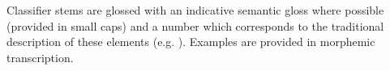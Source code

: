 \documentclass[output=paper,colorlinks,citecolor=brown]{langscibook}
\begin{document}
\noindent
Classifier stems are glossed with an indicative semantic gloss where possible (provided in small caps) and a number which corresponds to the traditional description of these elements (e.g. \citealt{BlytheEtAl2007}). Examples are provided in morphemic transcription.
    

\sloppy\printbibliography[heading=subbibliography,notkeyword=this]
\end{document}
